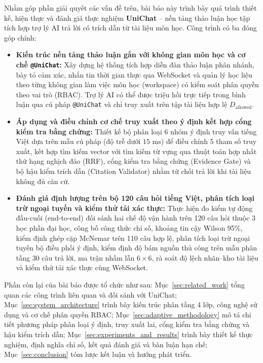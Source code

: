 \documentclass{IEEEtran}
\begin{document}
Nhằm góp phần giải quyết các vấn đề trên, bài báo này trình bày quá trình thiết kế, hiện thực và đánh giá thực nghiệm \textbf{UniChat} -- nền tảng thảo luận học tập tích hợp trợ lý AI trả lời có trích dẫn từ tài liệu môn học. Công trình có ba đóng góp chính:
\begin{itemize}
    \item \textbf{Kiến trúc nền tảng thảo luận gắn với không gian môn học và cơ chế \texttt{@UniChat}:} Xây dựng hệ thống tích hợp diễn đàn thảo luận phân nhánh, bày tỏ cảm xúc, nhắn tin thời gian thực qua WebSocket và quản lý học liệu theo từng không gian làm việc môn học (workspace) có kiểm soát phân quyền theo vai trò (RBAC). Trợ lý AI có thể được triệu hồi trực tiếp trong bình luận qua cú pháp \texttt{@UniChat} và chỉ truy xuất trên tập tài liệu hợp lệ $D_{\text{allowed}}$.
    \item \textbf{Áp dụng và điều chỉnh cơ chế truy xuất theo ý định kết hợp cổng kiểm tra bằng chứng:} Thiết kế bộ phân loại 6 nhóm ý định truy vấn tiếng Việt dựa trên mẫu cú pháp (độ trễ dưới $15\text{~ms}$) để điều chỉnh 5 tham số truy xuất, kết hợp tìm kiếm vector với tìm kiếm từ vựng qua thuật toán hợp nhất thứ hạng nghịch đảo (RRF), cổng kiểm tra bằng chứng (Evidence Gate) và bộ hậu kiểm trích dẫn (Citation Validator) nhằm từ chối trả lời khi tài liệu không đủ căn cứ.
    \item \textbf{Đánh giá định lượng trên bộ 120 câu hỏi tiếng Việt, phân tích loại trừ ngoại tuyến và kiểm thử tải xác thực:} Thực hiện đo kiểm tự động đầu-cuối (end-to-end) đối sánh hai chế độ vận hành trên 120 câu hỏi thuộc 3 học phần đại học, công bố công thức chỉ số, khoảng tin cậy Wilson 95\%, kiểm định ghép cặp McNemar trên 110 câu hợp lệ, phân tích loại trừ ngoại tuyến bộ điều phối ý định, kiểm định độ bám nguồn thủ công trên mẫu phân tầng 30 câu trả lời, ma trận nhầm lẫn $6 \times 6$, rà soát độ lệch nhãn--kho tài liệu và kiểm thử tải xác thực cùng WebSocket.
\end{itemize}

Phần còn lại của bài báo được tổ chức như sau: Mục~\ref{sec:related_work} tổng quan các công trình liên quan và đối sánh với UniChat; Mục~\ref{sec:system_architecture} trình bày kiến trúc phân tầng 4 lớp, công nghệ sử dụng và cơ chế phân quyền RBAC; Mục~\ref{sec:adaptive_methodology} mô tả chi tiết phương pháp phân loại ý định, truy xuất lai, cổng kiểm tra bằng chứng và hậu kiểm trích dẫn; Mục~\ref{sec:experiments_and_results} trình bày thiết kế thực nghiệm, định nghĩa chỉ số, kết quả đánh giá và bàn luận hạn chế; Mục~\ref{sec:conclusion} tóm lược kết luận và hướng phát triển.
\end{document}
